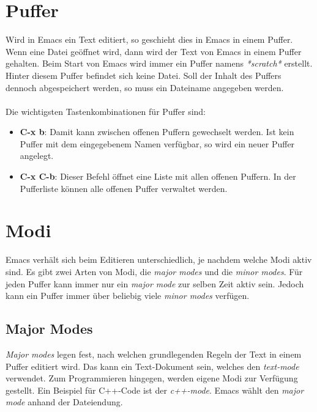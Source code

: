\section{Puffer}
\label{sec:puff}
Wird in Emacs ein Text editiert, so geschieht dies in Emacs in einem
Puffer. Wenn eine Datei geöffnet wird, dann wird der Text von Emacs in
einem Puffer gehalten. Beim Start von Emacs wird immer ein Puffer
namens \textit{*scratch*} erstellt. Hinter diesem Puffer befindet sich
keine Datei. Soll der Inhalt des Puffers dennoch abgespeichert werden,
so muss ein Dateiname angegeben werden. \cite{PufferInEmacs}\\\\ Die
wichtigsten Tastenkombinationen für Puffer sind:
\begin{itemize}
\item \textbf{C-x b}: Damit kann zwischen offenen Puffern gewechselt
  werden. Ist kein Puffer mit dem eingegebenem Namen verfügbar, so
  wird ein neuer Puffer angelegt.
\item \textbf{C-x C-b}: Dieser Befehl öffnet eine Liste mit allen
  offenen Puffern. In der {\glqq}Pufferliste{\grqq} können alle
  offenen Puffer verwaltet werden.\\
\end{itemize}

\section{Modi}
Emacs verhält sich beim Editieren unterschiedlich, je nachdem welche
Modi aktiv sind. Es gibt zwei Arten von Modi, die \textit{major modes}
und die \textit{minor modes}. Für jeden Puffer kann immer nur ein
\textit{major mode} zur selben Zeit aktiv sein. Jedoch kann ein Puffer
immer über beliebig viele \textit{minor modes} verfügen. \cite{EmacsManual}\\

\subsection{Major Modes}
\label{subsec:majormodes}
\textit{Major modes} legen fest, nach welchen grundlegenden Regeln der
Text in einem Puffer editiert wird. Das kann ein Text-Dokument sein,
welches den \textit{text-mode} verwendet. Zum Programmieren hingegen,
werden eigene Modi zur Verfügung gestellt. Ein Beispiel für C++-Code
ist der \textit{c++-mode}. Emacs wählt den \textit{major mode} anhand
der Dateiendung. \cite{EmacsManual}\\

